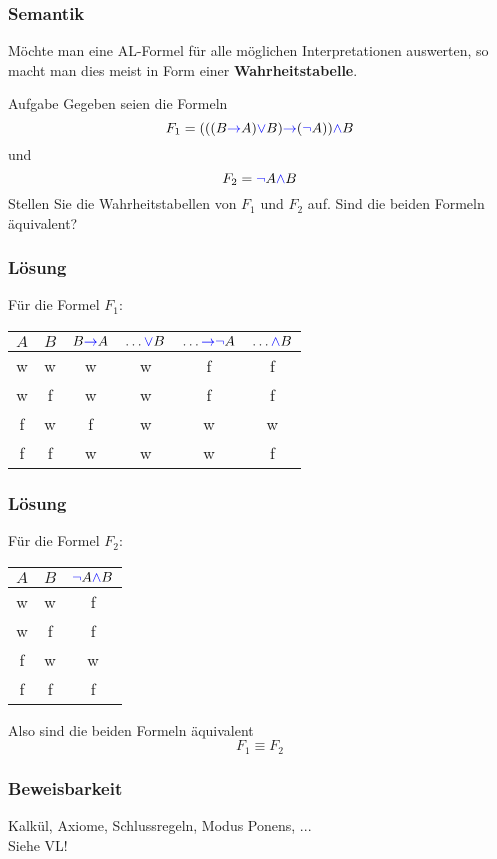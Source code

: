 \begin{frame}
	\frametitle{Semantik}
	
	Möchte man eine AL-Formel für alle möglichen Interpretationen auswerten, so macht man dies meist in Form einer \textbf{Wahrheitstabelle}.
	
	\begin{block}{Aufgabe}
		Gegeben seien die Formeln
		$$ F_1 = (((B \textcolor{blue}{\to}\text{} A) \textcolor{blue}{\vee}\text{} B) \textcolor{blue}{\to}\text{} (\textcolor{blue}{\neg}\text{} A)) \textcolor{blue}{\wedge}\text{} B$$
		und
		$$F_2 = \textcolor{blue}{\neg}\text{} A \textcolor{blue}{\wedge}\text{} B$$
		Stellen Sie die Wahrheitstabellen von $F_1$ und $F_2$ auf. Sind die beiden Formeln äquivalent?
	\end{block}
\end{frame}

\begin{frame}
	\frametitle{Lösung}
	Für die Formel $F_1$:
	\begin{table}[H]
	\centering
	\begin{tabular}{|*{6}{c|}}
	\hline
	$A$ & $B$ & $B \textcolor{blue}{\to}\text{} A$ &  $\dots \textcolor{blue}{\vee}\text{} B$ & $\dots \textcolor{blue}{\to}\text{} \textcolor{blue}{\neg}\text{} A$ & $\dots \textcolor{blue}{\wedge}\text{} B$ \pause \\ \hline
	w & w & w & w & f & f \pause \\ \hline 
	w & f & w & w & f & f \pause \\ \hline
	f & w & f & w & w & w \pause \\ \hline
	f & f & w & w & w & f \\ \hline
	\end{tabular}
	\end{table}
\end{frame}

\begin{frame}
	\frametitle{Lösung}
	Für die Formel $F_2$:
	\begin{table}[h!]
	\centering
	\begin{tabular}{|*{3}{c|}}
	\hline
	$A$ & $B$ & $\textcolor{blue}{\neg}\text{} A \textcolor{blue}{\wedge}\text{} B$ \pause  \\ \hline
	w & w & f \pause  \\ \hline
	w & f & f \pause  \\ \hline
	f & w & w \pause  \\ \hline
	f & f & f \\ \hline
	\end{tabular}
	\end{table}
	Also sind die beiden Formeln äquivalent $$F_1 \equiv F_2$$
\end{frame}

\begin{frame}
	\frametitle{Beweisbarkeit}
	Kalkül, Axiome, Schlussregeln, Modus Ponens, ...\\
	Siehe VL!
\end{frame}